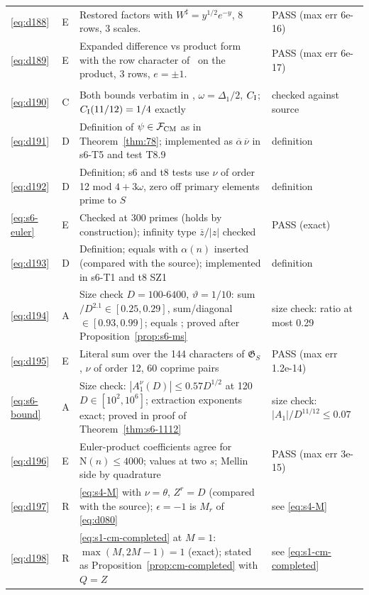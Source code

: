 \documentclass[11pt]{article}
\numberwithin{equation}{section}
\newcommand{\N}{\mathrm N}
\begin{document}
\begin{longtable}{@{}>{\raggedright\arraybackslash}p{1.2cm}>{\centering\arraybackslash}p{0.7cm}>{\raggedright\arraybackslash}p{9.05cm}>{\raggedright\arraybackslash}p{4.3cm}@{}}
\eqref{eq:d188} & E & Restored factors with $W^\sharp=y^{1/2}e^{-y}$, 8 rows, 3 scales. & PASS (max err 6e-16)\\
\eqref{eq:d189} & E & Expanded difference vs product form with the row character of~\cite{OAI78} on the product, 3 rows, $e=\pm1$. & PASS (max err 6e-17)\\
\multicolumn{4}{@{}l}{\emph{Appendix~G}}\\
\eqref{eq:d190} & C & Both bounds verbatim in \cite{OAI78}, $\omega=\Delta_1/2$, $C_{\rm I}$; $C_{\rm I}(11/12)=1/4$ exactly & checked against source\\
\eqref{eq:d191} & D & Definition of $\psi\in\mathcal F_{\rm CM}$ as in Theorem~\ref{thm:78}; implemented as $\overline\alpha\,\overline\nu$ in s6-T5 and test T8.9 & definition\\
\eqref{eq:d192} & D & Definition; s6 and t8 tests use $\nu$ of order 12 mod $4+3\omega$, zero off primary elements prime to $S$ & definition\\
\eqref{eq:s6-euler} & E & Checked at 300 primes (holds by construction); infinity type $\overline z/|z|$ checked & PASS (exact)\\
\eqref{eq:d193} & D & Definition; equals \cite{OAI1112} with $\alpha(n)$ inserted (compared with the source); implemented in s6-T1 and t8 SZ1 & definition\\
\eqref{eq:d194} & A & Size check $D=100$-$6400$, $\vartheta=1/10$: sum$/D^{2.1}\in[0.25,0.29]$, sum/diagonal $\in[0.93,0.99]$; equals \cite[eq.~(3.1)]{OAI1112}; proved after Proposition~\ref{prop:s6-ms} & size check: ratio at most 0.29\\
\eqref{eq:d195} & E & Literal sum over the 144 characters of $\mathfrak G_S$, $\nu$ of order 12, 60 coprime pairs & PASS (max err 1.2e-14)\\
\eqref{eq:s6-bound} & A & Size check: $|A_1^\nu(D)|\le0.57D^{1/2}$ at 120 $D\in[10^2,10^6]$; extraction exponents exact; proved in proof of Theorem~\ref{thm:s6-1112} & size check: $|A_1|/D^{11/12}\le0.07$\\
\eqref{eq:d196} & E & Euler-product coefficients agree for $\N(n)\le4000$; values at two $s$; Mellin side by quadrature & PASS (max err 3e-15)\\
\eqref{eq:d197} & R & \eqref{eq:s4-M} with $\nu=\theta$, $Z^r=D$ (compared with the source); $\epsilon=-1$ is $M_r$ of \eqref{eq:d080} & see \eqref{eq:s4-M}\\
\eqref{eq:d198} & R & \eqref{eq:s1-cm-completed} at $M=1$: $\max(M,2M-1)=1$ (exact); stated as Proposition~\ref{prop:cm-completed} with $Q=Z$ & see \eqref{eq:s1-cm-completed}\\
\end{longtable}
\endgroup
\end{document}
